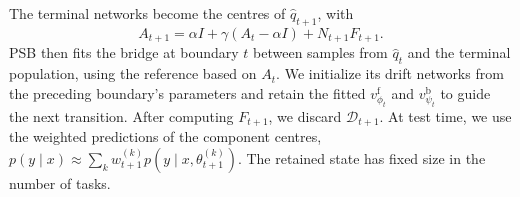The terminal networks become the centres of $\hat q_{t+1}$, with
\begin{equation}
    A_{t+1}=\alpha I+\gamma(A_t-\alpha I)+N_{t+1}F_{t+1}.
    \label{eq:precisionupdate}
\end{equation}
PSB then fits the bridge at boundary $t$ between samples from
$\hat q_t$ and the terminal population, using the reference based on
$A_t$. We initialize its drift networks from the preceding boundary's
parameters and retain the fitted $v^{\mathrm f}_{\phi_t}$ and
$v^{\mathrm b}_{\psi_t}$ to guide the next transition. After computing
$F_{t+1}$, we discard $\mathcal{D}_{t+1}$. At test time, we use the
weighted predictions of the component centres,
$p(y\mid x)\approx\sum_k w_{t+1}^{(k)}
p(y\mid x,\theta_{t+1}^{(k)})$. The retained state has fixed size in the
number of tasks.
